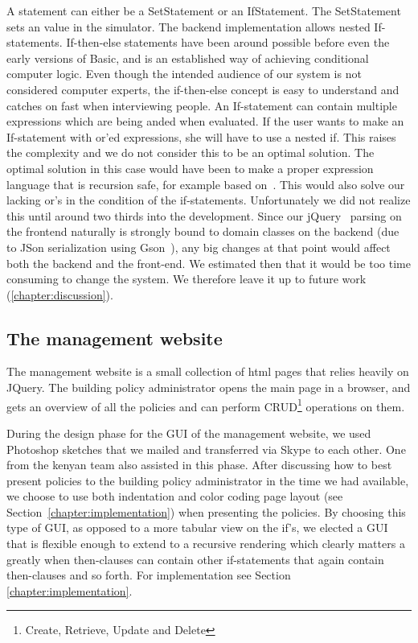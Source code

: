 A statement can either be a SetStatement or an IfStatement. The SetStatement sets an value in the simulator. The backend implementation allows nested If-statements. If-then-else statements have been around possible before even the early versions of Basic, and is an established way of achieving conditional computer logic. Even though the intended audience of our system is not considered computer experts, the if-then-else concept is easy to understand and catches on fast when interviewing people. An If-statement can contain multiple expressions which are being anded when evaluated. If the user wants to make an If-statement with or'ed expressions, she will have to use a nested if. This raises the complexity and we do not consider this to be an optimal solution. The optimal solution in this case would have been to make a proper expression language that is recursion safe, for example based on~\cite{left-recursion}. This would also solve our lacking or's in the condition of the if-statements. Unfortunately we did not realize this until around two thirds into the development. Since our jQuery~\cite{jquery} parsing on the frontend naturally is strongly bound to domain classes on the backend (due to JSon serialization using Gson~\cite{gson}), any big changes at that point would affect both the backend and the front-end. We estimated then that it would be too time consuming to change the system. We therefore leave it up to future work (\ref{chapter:discussion}).

\subsection{The management website}
The management website is a small collection of html pages that relies heavily on JQuery. The building policy administrator opens the main page in a browser, and gets an overview of all the policies and can perform CRUD\footnote{Create, Retrieve, Update and Delete} operations on them.

During the design phase for the GUI of the management website, we used Photoshop sketches that we mailed and transferred via Skype to each other. One from the kenyan team also assisted in this phase. After discussing how to best present policies to the building policy administrator in the time we had available, we choose to use both indentation and color coding page layout (see Section~\ref{chapter:implementation}) when presenting the policies. By choosing this type of GUI, as opposed to a more tabular view on the if's, we elected a GUI that is flexible enough to extend to a recursive rendering which clearly matters a greatly when then-clauses can contain other if-statements that again contain then-clauses and so forth. For implementation see Section \ref{chapter:implementation}.

